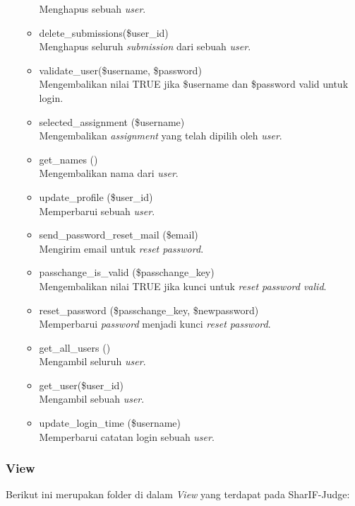 \begin{itemize}
\begin{itemize}
 Menghapus sebuah \textit{user}.
    \item delete\_submissions(\$user\_id) \\
 Menghapus seluruh \textit{submission} dari sebuah \textit{user}.
    \item validate\_user(\$username, \$password)\\
 Mengembalikan nilai TRUE jika \$username dan \$password valid untuk login.
    \item selected\_assignment (\$username)\\
 Mengembalikan \textit{assignment} yang telah dipilih oleh \textit{user}.
    \item get\_names ()\\
 Mengembalikan nama dari \textit{user}.
    \item update\_profile (\$user\_id)\\
 Memperbarui sebuah \textit{user}.
    \item send\_password\_reset\_mail (\$email)\\
 Mengirim email untuk \textit{reset password}.
    \item passchange\_is\_valid (\$passchange\_key) \\
 Mengembalikan nilai TRUE jika kunci untuk \textit{reset password valid}.
    \item reset\_password (\$passchange\_key, \$newpassword)\\
 Memperbarui \textit{password} menjadi kunci \textit{reset password}.
    \item get\_all\_users ()\\
 Mengambil seluruh \textit{user}.
    \item get\_user(\$user\_id) \\
 Mengambil sebuah \textit{user}.
    \item update\_login\_time (\$username) \\
 Memperbarui catatan login sebuah \textit{user}.
    \end{itemize}
\end{itemize}

\subsubsection{View}
Berikut ini merupakan folder di dalam \textit{View} yang terdapat pada SharIF-Judge:

